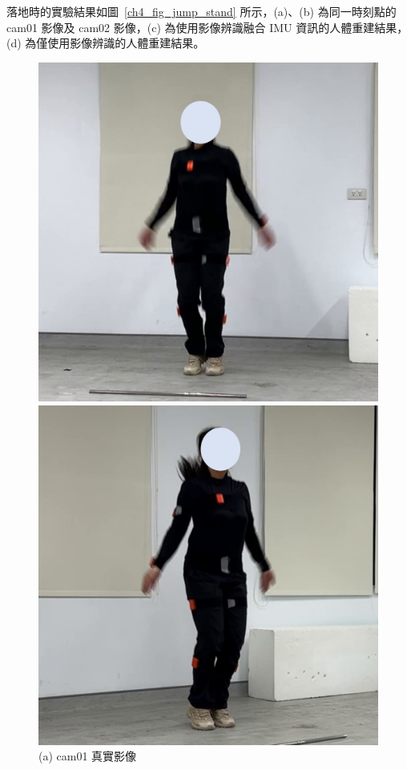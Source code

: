 \clearpage

落地時的實驗結果如圖~\ref{ch4_fig_jump_stand} 所示，(a)、(b) 為同一時刻點的 cam01 影像及 cam02 影像，(c) 為使用影像辨識融合 IMU 資訊的人體重建結果，(d) 為僅使用影像辨識的人體重建結果。

\begin{figure}[!ht]
   \centering
   \begin{minipage}{.5\textwidth}
      \centering
      \includegraphics[width=.95\linewidth]{figure/ch4_fig_jump_cam01_with2.jpg}
      \caption*{(a) cam01 真實影像}
    \end{minipage}%
    \begin{minipage}{.5\textwidth}
       \centering
       \includegraphics[width=.95\linewidth]{figure/ch4_fig_jump_cam02_with2.jpg}

\end{minipage}
\end{figure}
